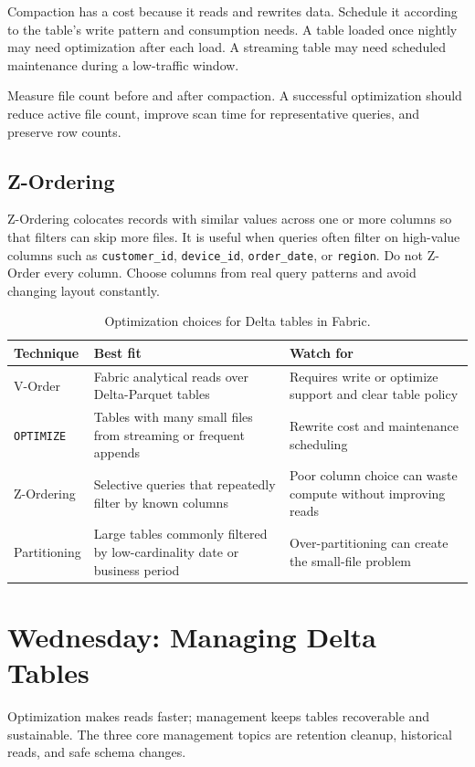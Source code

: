 Compaction has a cost because it reads and rewrites data. Schedule it according to the table's write pattern and consumption needs. A table loaded once nightly may need optimization after each load. A streaming table may need scheduled maintenance during a low-traffic window.

\begin{tipbox}
Measure file count before and after compaction. A successful optimization should reduce active file count, improve scan time for representative queries, and preserve row counts.
\end{tipbox}

\subsection{Z-Ordering}
Z-Ordering colocates records with similar values across one or more columns so that filters can skip more files. It is useful when queries often filter on high-value columns such as \texttt{customer\_id}, \texttt{device\_id}, \texttt{order\_date}, or \texttt{region}. Do not Z-Order every column. Choose columns from real query patterns and avoid changing layout constantly.

\begin{table}[H]
\centering
\small
\begin{tabular}{@{}p{3.1cm}p{5.0cm}p{5.0cm}@{}}
\toprule
\textbf{Technique} & \textbf{Best fit} & \textbf{Watch for} \\
\midrule
V-Order & Fabric analytical reads over Delta-Parquet tables & Requires write or optimize support and clear table policy \\
\texttt{OPTIMIZE} & Tables with many small files from streaming or frequent appends & Rewrite cost and maintenance scheduling \\
Z-Ordering & Selective queries that repeatedly filter by known columns & Poor column choice can waste compute without improving reads \\
Partitioning & Large tables commonly filtered by low-cardinality date or business period & Over-partitioning can create the small-file problem \\
\bottomrule
\end{tabular}
\caption{Optimization choices for Delta tables in Fabric.}
\label{tab:chapter4-optimization-choices}
\end{table}

\section{Wednesday: Managing Delta Tables}
Optimization makes reads faster; management keeps tables recoverable and sustainable. The three core management topics are retention cleanup, historical reads, and safe schema changes.

